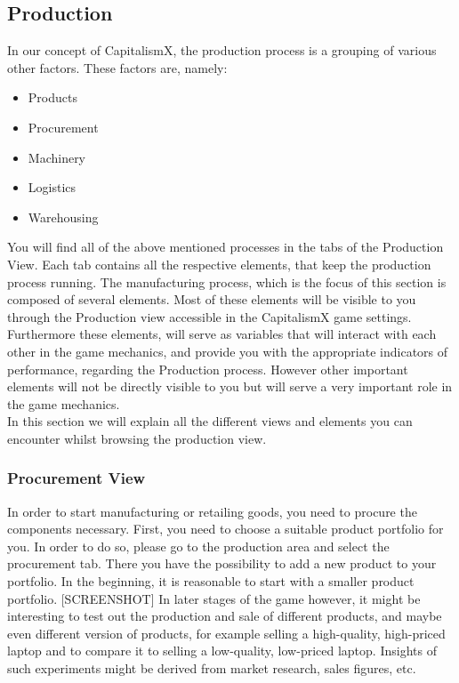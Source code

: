 \subsection{Production}
\label{production_manual}

In our concept of CapitalismX, the production process is a grouping of various other factors. These factors are, namely: 
\begin{itemize} 
\item Products 
\item Procurement  
\item Machinery 
\item Logistics 
\item Warehousing 
\end{itemize}
You will find all of the above mentioned processes in the tabs of the Production View. Each tab contains all the respective elements, that keep the production process running.
The manufacturing process, which is the focus of this section is composed of several elements. Most of these elements will be visible to you through the Production view accessible in the CapitalismX game settings. Furthermore these elements, will serve as variables that will interact with each other in the game mechanics, and provide you with the appropriate indicators of performance, regarding the Production process. However other important elements will not be directly visible to you but will serve a very important role in the game mechanics. \\
In this section we will explain all the different views and elements you can encounter whilst browsing the production view.

\subsubsection{Procurement View}
\label{sub:ProcurementView}
In order to start manufacturing or retailing goods, you need to procure the components necessary. First, you need to choose a suitable product portfolio for you. In order to do so, please go to the production area and select the procurement tab. There you have the possibility to add a new product to your portfolio. In the beginning, it is reasonable to start with a smaller product portfolio. [SCREENSHOT] In later stages of the game however, it might be interesting to test out the production and sale of different products, and maybe even different version of products, for example selling a high-quality, high-priced laptop and to compare it to selling a low-quality, low-priced laptop. Insights of such experiments might be derived from market research, sales figures, etc.

